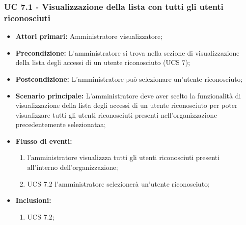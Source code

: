 \subsubsection{UC 7.1 - Visualizzazione della lista con tutti gli utenti riconosciuti }
\begin{itemize}
	\item \textbf{Attori primari:} Amministratore visualizzatore;
	\item \textbf{Precondizione:} L'amministratore si trova nella sezione di visualizzazione della lista degli accessi di un utente riconosciuto (UCS 7);
	\item \textbf{Postcondizione:} L'amministratore può selezionare un'utente riconosciuto;
	\item \textbf{Scenario principale:} L'amministratore deve aver scelto la funzionalità di visualizzazione della lista degli accessi di un utente riconosciuto per poter visualizzare tutti gli utenti riconosciuti presenti nell'organizzazione precedentemente selezionataa;
	\item \textbf{Flusso di eventi:} 
	\begin{enumerate}
		\item l'amministratore visualizzza tutti gli utenti riconosciuti presenti all'interno dell'organizzazione;
		\item UCS 7.2 l'amministratore selezionerà un'utente riconosciuto;
	\end{enumerate}
	\item \textbf{Inclusioni:}
	\begin{enumerate}
		\item UCS 7.2;
	\end{enumerate}
\end{itemize}

